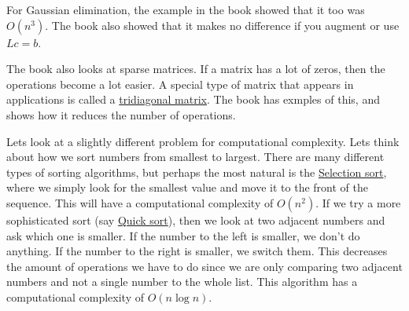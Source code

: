 \documentclass[reqno]{amsart}
\theoremstyle{definition}
\begin{document}
For Gaussian elimination, the example in the book showed that it too was $O(n^3)$.  The book also showed that it makes no difference if you augment or use $Lc = b$.

The book also looks at sparse matrices.  If a matrix has a lot of zeros, then the operations become a lot easier.  A special type of matrix that appears in applications is called a \underline{tridiagonal matrix}.  The book has exmples of this, and shows how it reduces the number of operations.

Lets look at a slightly different problem for computational complexity.  Lets think about how we sort numbers from smallest to largest.  There are many different types of sorting algorithms, but perhaps the most natural is the \underline{Selection sort}, where we simply look for the smallest value and move it to the front of the sequence.  This will have a computational complexity of $O(n^2)$.  If we try a more sophisticated sort (say \underline{Quick sort}), then we look at two adjacent numbers and ask which one is smaller.  If the number to the left is smaller, we don't do anything.  If the number to the right is smaller, we switch them.  This decreases the amount of operations we have to do since we are only comparing two adjacent numbers and not a single number to the whole list.  This algorithm has a computational complexity of $O(n\log n)$.
\end{document}
